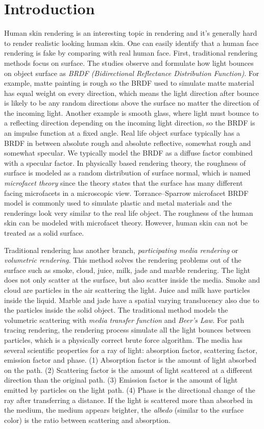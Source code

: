 \documentclass[letterpaper,12pt]{article}
\begin{document}
\section{Introduction}
Human skin rendering is an interesting topic in rendering and it's generally hard to render realistic looking human skin. One can easily identify that a human face rendering is fake by comparing with real human face. First, traditional rendering methods focus on surface. The studies observe and formulate how light bounces on object surface as \textit{BRDF (Bidirectional Reflectance Distribution Function)}. For example, matte painting is rough so the BRDF used to simulate matte material has equal weight on every direction, which means the light direction after bounce is likely to be any random directions above the surface no matter the direction of the incoming light. Another example is smooth glass, where light must bounce to a reflecting direction depending on the incoming light direction, so the BRDF is an impulse function at a fixed angle. Real life object surface typically has a BRDF in between absolute rough and absolute reflective, somewhat rough and somewhat specular. We typically model the BRDF as a diffuse factor combined with a specular factor. In physically based rendering theory, the roughness of surface is modeled as a random distribution of surface normal, which is named \textit{microfacet theory} since the theory states that the surface has many different facing microfacets in a microscopic view. Torrance–Sparrow microfacet BRDF model is commonly used to simulate plastic and metal materials and the renderings look very similar to the real life object. The roughness of the human skin can be modeled with microfacet theory. However, human skin can not be treated as a solid surface.

Traditional rendering has another branch, \textit{participating media rendering} or \textit{volumetric rendering}. This method solves the rendering problems out of the surface such as smoke, cloud, juice, milk, jade and marble rendering. The light does not only scatter at the surface, but also scatter inside the media. Smoke and cloud are particles in the air scattering the light. Juice and milk have particles inside the liquid. Marble and jade have a spatial varying translucency also due to the particles inside the solid object. The traditional method models the volumetric scattering with \textit{media transfer function} and \textit{Beer's Law}. For path tracing rendering, the rendering process simulate all the light bounces between particles, which is a physically correct brute force algorithm. The media has several scientific properties for a ray of light: absorption factor, scattering factor, emission factor and phase. (1) Absorption factor is the amount of light absorbed on the path. (2) Scattering factor is the amount of light scattered at a different direction than the original path. (3) Emission factor is the amount of light emitted by particles on the light path. (4) Phase is the directional change of the ray after transferring a distance. If the light is scattered more than absorbed in the medium, the medium appears brighter, the \textit{albedo} (similar to the surface color) is the ratio between scattering and absorption.
\end{document}
